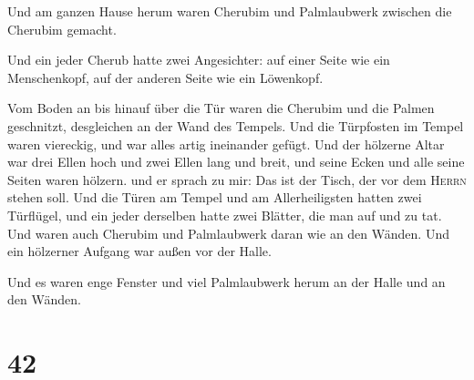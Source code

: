  Und am ganzen Hause herum waren Cherubim und
Palmlaubwerk zwischen die Cherubim gemacht.

 Und ein jeder Cherub hatte zwei Angesichter: auf einer
Seite wie ein Menschenkopf, auf der anderen Seite wie ein Löwenkopf.

 Vom Boden an bis hinauf über die Tür waren die Cherubim
und die Palmen geschnitzt, desgleichen an der Wand des Tempels.
 Und die Türpfosten im Tempel waren viereckig, und war
alles artig ineinander gefügt.  Und der hölzerne Altar
war drei Ellen hoch und zwei Ellen lang und breit, und seine Ecken und
alle seine Seiten waren hölzern. und er sprach zu mir: Das ist der
Tisch, der vor dem \textsc{Herrn} stehen soll.  Und die
Türen am Tempel und am Allerheiligsten  hatten zwei
Türflügel, und ein jeder derselben hatte zwei Blätter, die man auf und
zu tat.  Und waren auch Cherubim und Palmlaubwerk daran
wie an den Wänden. Und ein hölzerner Aufgang war außen vor der Halle.

 Und es waren enge Fenster und viel Palmlaubwerk herum an
der Halle und an den Wänden.

\hypertarget{section-41}{%
\section{42}\label{section-41}}


